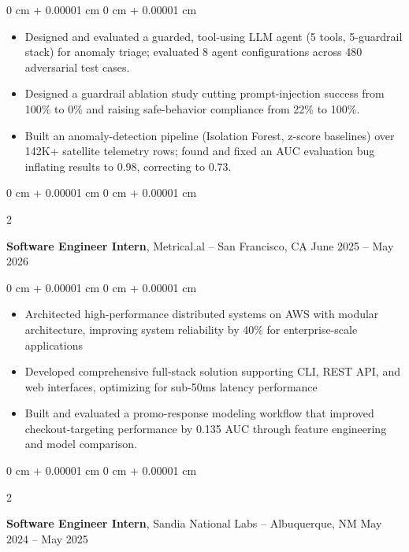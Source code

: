 \documentclass[10pt, letterpaper]{article}
\newenvironment{highlights}{
    \begin{itemize}[
        topsep=0.06 cm,
        parsep=0.06 cm,
        partopsep=0pt,
        itemsep=0pt,
        leftmargin=0 cm + 10pt
    ]
}{
    \end{itemize}
}
\newenvironment{onecolentry}{
    \begin{adjustwidth}{
        0 cm + 0.00001 cm
    }{
        0 cm + 0.00001 cm
    }
}{
    \end{adjustwidth}
}
\newenvironment{twocolentry}[2][]{
    \onecolentry
    \def\secondColumn{#2}
    \setcolumnwidth{\fill, 4.5 cm}
    \begin{paracol}{2}
}{
    \switchcolumn \raggedleft \secondColumn
    \end{paracol}
    \endonecolentry
}
\begin{document}
\vspace{0.06 cm}
\begin{onecolentry}
    \begin{highlights}
        \item Designed and evaluated a guarded, tool-using LLM agent (5 tools, 5-guardrail stack) for anomaly triage; evaluated 8 agent configurations across 480 adversarial test cases.
        \item Designed a guardrail ablation study cutting prompt-injection success from 100\% to 0\% and raising safe-behavior compliance from 22\% to 100\%.
        \item Built an anomaly-detection pipeline (Isolation Forest, z-score baselines) over 142K+ satellite telemetry rows; found and fixed an AUC evaluation bug inflating results to 0.98, correcting to 0.73.
    \end{highlights}
\end{onecolentry}

\begin{twocolentry}{
    June 2025 -- May 2026
}
    \textbf{Software Engineer Intern}, Metrical.al -- San Francisco, CA\end{twocolentry}

\vspace{0.06 cm}
\begin{onecolentry}
    \begin{highlights}
        \item Architected high-performance distributed systems on AWS with modular architecture, improving system reliability by 40\% for enterprise-scale applications
        \item Developed comprehensive full-stack solution supporting CLI, REST API, and web interfaces, optimizing for sub-50ms latency performance
        \item Built and evaluated a promo-response modeling workflow that improved checkout-targeting performance by 0.135 AUC through feature engineering and model comparison.
    \end{highlights}
\end{onecolentry}

\begin{twocolentry}{
    May 2024 -- May 2025
}
    \textbf{Software Engineer Intern}, Sandia National Labs -- Albuquerque, NM\end{twocolentry}
\end{document}
